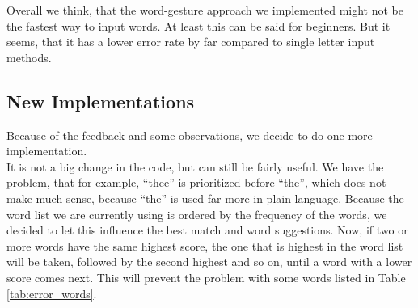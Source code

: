 Overall we think, that the word-gesture approach we implemented might not be the fastest way to input words. At least this can be said for beginners. But it seems, that it has a lower error rate by far compared to single letter input methods.

\subsection{New Implementations}
Because of the feedback and some observations, we decide to do one more implementation.\\
It is not a big change in the code, but can still be fairly useful. We have the problem, that for example, ``thee'' is prioritized before ``the'', which does not make much sense, because ``the'' is used far more in plain language. Because the word list we are currently using is ordered by the frequency of the words, we decided to let this influence the best match and word suggestions. Now, if two or more words have the same highest score, the one that is highest in the word list will be taken, followed by the second highest and so on, until a word with a lower score comes next. This will prevent the problem with some words listed in Table \ref{tab:error_words}.